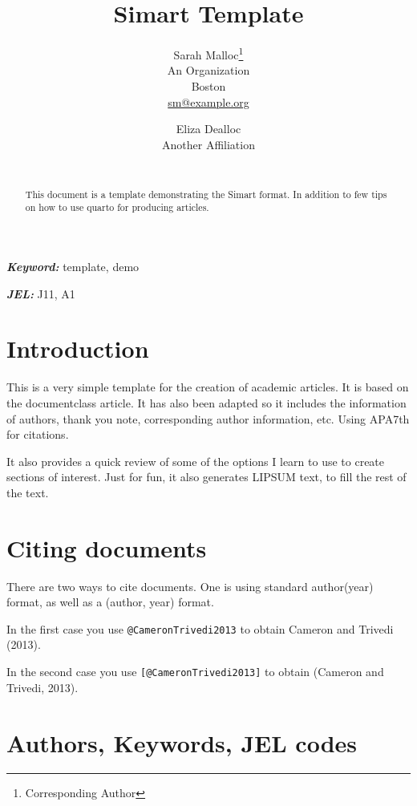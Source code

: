 \documentclass[
  12pt,
]{article}
\title{Simart Template}
\author{
Sarah Malloc\footnote{Corresponding Author}\\
An Organization\\
Boston\\
\href{mailto:sm@example.org}{sm@example.org}\and 
Eliza Dealloc\\
Another Affiliation\\
\\
}
\date{}
\begin{document}
\def\spacingset#1{\renewcommand{\baselinestretch}%
{#1}\small\normalsize} \spacingset{1}


\maketitle
\begin{abstract}
This document is a template demonstrating the Simart format. In addition
to few tips on how to use quarto for producing articles.
\end{abstract}
 
\vspace{.2in}

\textbf{\textit{Keyword: }}
    template, 
    demo 

\textbf{\textit{JEL: }}
    J11, 
    A1 

\thispagestyle{empty}
\clearpage{}
\newpage
\spacingset{1.2} %
\section{Introduction}\label{sec-intro}

This is a very simple template for the creation of academic articles. It
is based on the documentclass article. It has also been adapted so it
includes the information of authors, thank you note, corresponding
author information, etc. Using APA7th for citations.

It also provides a quick review of some of the options I learn to use to
create sections of interest. Just for fun, it also generates LIPSUM
text, to fill the rest of the text.

\section{Citing documents}\label{sec-cite}

There are two ways to cite documents. One is using standard author(year)
format, as well as a (author, year) format.

In the first case you use \texttt{@CameronTrivedi2013} to obtain Cameron
and Trivedi (2013).

In the second case you use \texttt{{[}@CameronTrivedi2013{]}} to obtain
(Cameron and Trivedi, 2013).

\section{Authors, Keywords, JEL codes}\label{authors-keywords-jel-codes}
\end{document}
